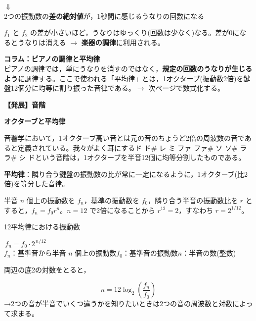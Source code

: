\documentclass[a4paper,11pt]{ltjsarticle}
\newcommand{\banner}[1]{%
  \begin{tcolorbox}[colback=black,coltext=white,boxrule=0pt,sharp corners,
    left=8pt,right=8pt,top=5pt,bottom=5pt,before skip=8pt,after skip=8pt]
    {\Large\bfseries #1}
  \end{tcolorbox}}
\newcommand{\subbanner}[1]{%
  \begin{tcolorbox}[colback=black!85,coltext=white,boxrule=0pt,sharp corners,
    left=6pt,right=6pt,top=3pt,bottom=3pt,before skip=6pt,after skip=5pt]
    {\bfseries #1}
  \end{tcolorbox}}
\newcommand{\Meaning}[1]{%
  \begin{center}
  $\Downarrow$\\[2pt]
  {\small #1}
  \end{center}}
\begin{document}
\Meaning{2つの振動数の\textbf{差の絶対値}が，1秒間に感じるうなりの回数になる}

\begin{pointbox}
$f_1$ と $f_2$ の差が小さいほど，うなりはゆっくり(回数は少なく)なる。差が0になるとうなりは消える $\to$ \textbf{楽器の調律}に利用される。
\end{pointbox}

\begin{examplebox}
\textbf{コラム：ピアノの調律と平均律}\\
ピアノの調律では，単にうなりを消すのではなく，\textbf{規定の回数のうなりが生じるように}調律する。ここで使われる「平均律」とは，1オクターブ(振動数2倍)を鍵盤12個分に均等に割り振った音律である。$\to$ 次ページで数式化する。
\end{examplebox}

\clearpage

\banner{【発展】音階}

\subbanner{オクターブと平均律}

音響学において，1オクターブ高い音とは元の音のちょうど2倍の周波数の音であると定義されている。我々がよく耳にするド ド\#  レ ミ ファ ファ\# ソ ソ\# ラ ラ\# シ ドという音階は，1オクターブを半音12個に均等分割したものである。

\begin{defbox}
\textbf{平均律}：隣り合う鍵盤の振動数の比が常に一定になるように，1オクターブ(比2倍)を等分した音律。
\end{defbox}

半音 $n$ 個上の振動数を $f_n$，基準の振動数を $f_0$，隣り合う半音の振動数比を $r$ とすると，$f_n=f_0 r^n$。$n=12$ で2倍になることから $r^{12}=2$，すなわち $r=2^{1/12}$。

\begin{itembox}[l]{12平均律における振動数}
\begin{center}
$\boxed{\,f_n = f_0\cdot 2^{\,n/12}\,}$\\[4pt]
{\footnotesize $f_n$：基準音から半音 $n$ 個上の振動数\quad $f_0$：基準音の振動数\quad $n$：半音の数(整数)}
\end{center}
\end{itembox}

両辺の底2の対数をとると，

\[
n = 12\log_2\!\left(\dfrac{f_n}{f_0}\right)
\]
→2つの音が半音でいくつ違うかを知りたいときは2つの音の周波数と対数によって求まる。
\end{document}
